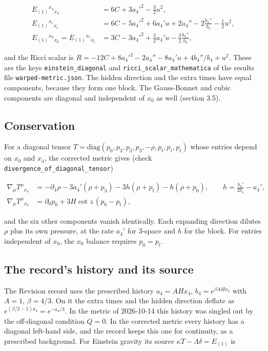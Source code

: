 \documentclass[11pt]{article}
\begin{document}
\[
\begin{aligned}
E_{(1)}{}^{x_4}{}_{x_4} &= 6C + 3a_4'^2 - \tfrac32 u^2, \\
E_{(1)}{}^{x_i}{}_{x_i} &= 6C - 5a_4'^2 + 6a_4'u + 2a_4'' - 2\frac{b_4''}{b_4} - \tfrac12 u^2, \\
E_{(1)}{}^{x_0}{}_{x_0} = E_{(1)}{}^{x_t}{}_{x_t} &= 3C - 3a_4'^2 + \tfrac32 a_4'u - \tfrac32\frac{b_4''}{b_4},
\end{aligned}
\]

and the Ricci scalar is $R = -12C + 8a_4'^2 - 2a_4'' - 8a_4'u + 4b_4''/b_4 + u^2$. These are the keys \texttt{einstein\allowbreak{}\_diagona\allowbreak{}l} and \texttt{ricci\_sc\allowbreak{}alar\_mat\allowbreak{}hematica} of the results file \texttt{warped-m\allowbreak{}etric.js\allowbreak{}on}. The hidden direction and the extra times have equal components, because they form one block. The Gauss-Bonnet and cubic components are diagonal and independent of $x_0$ as well (section 3.5).

\subsection{Conservation}

For a diagonal tensor $T = \mathrm{diag}(p_0, p_3, p_3, p_3, -\rho, p_t, p_t, p_t)$ whose entries depend on $x_0$ and $x_4$, the corrected metric gives (check \texttt{divergen\allowbreak{}ce\_of\_di\allowbreak{}agonal\_t\allowbreak{}ensor})

\[
\begin{aligned}
\nabla_\mu T^\mu{}_{x_4} &= -\partial_4\rho - 3a_4'(\rho + p_3) - 3h(\rho + p_t) - h(\rho + p_0),\qquad h = \frac{b_4'}{2b_4} - a_4', \\
\nabla_\mu T^\mu{}_{x_0} &= \partial_0 p_0 + 3H\cot z\,(p_0 - p_t),
\end{aligned}
\]

and the six other components vanish identically. Each expanding direction dilutes $\rho$ plus its own pressure, at the rate $a_4'$ for 3-space and $h$ for the block. For entries independent of $x_0$, the $x_0$ balance requires $p_0 = p_t$.

\subsection{The record's history and its source}

The Revision record uses the prescribed history $a_4 = AHx_4$, $b_4 = e^{\beta AHx_4}$ with $A = 1$, $\beta = 4/3$. On it the extra times and the hidden direction deflate as $e^{(\beta/2 - 1)a_4} = e^{-a_4/3}$. In the metric of 2026-10-14 this history was singled out by the off-diagonal condition $Q = 0$. In the corrected metric every history has a diagonal left-hand side, and the record keeps this one for continuity, as a prescribed background. For Einstein gravity its source $\kappa T - \Lambda\delta = E_{(1)}$ is
\end{document}
